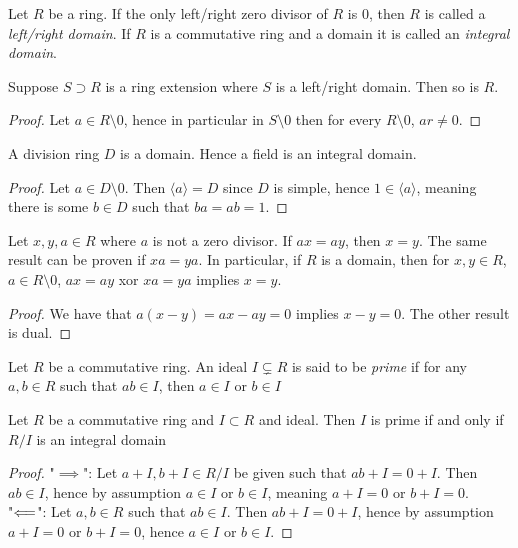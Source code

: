 \begin{definition}
    Let $R$ be a ring. If the only left/right zero divisor of $R$ is $0$, then $R$ is called a \textit{left/right domain}. If $R$ is a commutative ring and a domain it is called an \textit{integral domain}. 
\end{definition}
\begin{lemma}\label{SubringOfIDIsID}
    Suppose $S\supset R$ is a ring extension where $S$ is a left/right domain. Then so is $R$.
\end{lemma}
\begin{proof}
    Let $a\in R\setminus 0$, hence in particular in $S\setminus 0$ then for every $R\setminus 0$, $ar\neq0$. 
\end{proof}
\begin{proposition}
    A division ring $D$ is a domain. Hence a field is an integral domain.
\end{proposition}
\begin{proof}
    Let $a\in D\setminus 0$. Then $\langle a \rangle = D$ since $D$ is simple, hence $1\in \langle a\rangle$, meaning there is some $b\in D$ such that $ba = ab = 1$. 
\end{proof}
\begin{lemma}\label{WeCanDivideByElementsWhichAreNotZeroDivisors}
    Let $x,y, a\in R$ where $a$ is not a zero divisor. If $ax = ay$, then $x=y$. The same result can be proven if $xa = ya$. In particular, if $R$ is a domain, then for $x,y\in R$, $a\in R\setminus 0$, $ax=ay$ xor $xa=ya$ implies $x=y$. 
\end{lemma}
\begin{proof}
    We have that $a(x-y)=ax-ay = 0$ implies $x-y=0$. The other result is dual. 
\end{proof}
\begin{definition}
    Let $R$ be a commutative ring. An ideal $I\subsetneq R$ is said to be \textit{prime} if for any $a,b \in R$ such that $ab\in I$, then $a \in I$ or $b\in I$   
\end{definition}
\begin{lemma}\label{PrimeIdealIffQuotientRingID}
    Let $R$ be a commutative ring and $I\subset R$ and ideal. Then $I$ is prime if and only if $R/I$ is an integral domain
\end{lemma}
\begin{proof}
    "$\implies$": Let $a+I,b+I\in R/I$ be given such that $ab + I = 0 +I$. Then $ab\in I$, hence by assumption $a \in I$ or $b\in I$, meaning $a + I = 0$ or $b+ I =0$.\\
    "$\Longleftarrow$": Let $a,b\in R$ such that $ab \in I$. Then $ab + I = 0 + I$, hence by assumption $a+I = 0$ or $b + I = 0$, hence $a\in I$ or $b\in I$. 
\end{proof}

